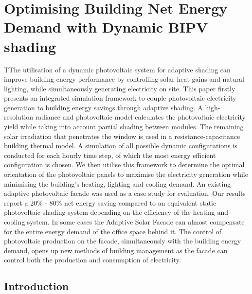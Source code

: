
\chapter{Optimising Building Net Energy Demand with Dynamic BIPV shading}
\label{ch:asfSimulation}

\graphicspath{{chapters/ch2asfSimulation//Images/}}

\begin{chapterabstract}
TThe utilisation of a dynamic photovoltaic system for adaptive shading can improve building energy performance by controlling solar heat gains and natural lighting, while simultaneously generating electricity on site. This paper firstly presents an integrated simulation framework to couple photovoltaic electricity generation to building energy savings through adaptive shading. A high-resolution radiance and photovoltaic model calculates the photovoltaic electricity yield while taking into account partial shading between modules. The remaining solar irradiation that penetrates the window is used in a resistance-capacitance building thermal model. A simulation of all possible dynamic configurations is conducted for each hourly time step, of which the most energy efficient configuration is chosen. We then utilise this framework to determine the optimal orientation of the photovoltaic panels to maximise the electricity generation while minimising the building's heating, lighting and cooling demand.  An existing adaptive photovoltaic facade was used as a case study for evaluation. Our results report a 20\% - 80\% net energy saving compared to an equivalent static photovoltaic shading system depending on the efficiency of the heating and cooling system. In some cases the Adaptive Solar Facade can almost compensate for the entire energy demand of the office space behind it. The control of photovoltaic production on the facade, simultaneously with the building energy demand, opens up new methods of building management as the facade can control both the production and consumption of electricity.
\end{chapterabstract}


\newpage

\section{Introduction}
\label{ch:introduction2}


